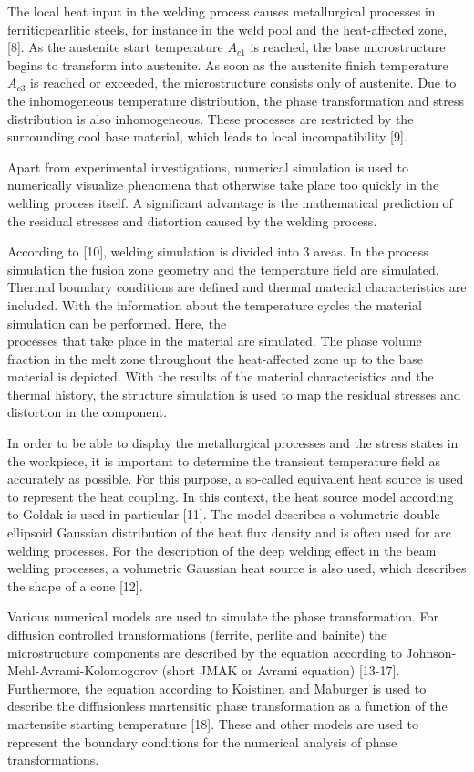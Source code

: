 \documentclass[10pt]{article}
\begin{document}
The local heat input in the welding process causes metallurgical processes in ferriticpearlitic steels, for instance in the weld pool and the heat-affected zone, [8]. As the austenite start temperature $A_{c 1}$ is reached, the base microstructure begins to transform into austenite. As soon as the austenite finish temperature $A_{c 3}$ is reached or exceeded, the microstructure consists only of austenite. Due to the inhomogeneous temperature distribution, the phase transformation and stress distribution is also inhomogeneous. These processes are restricted by the surrounding cool base material, which leads to local incompatibility [9].

Apart from experimental investigations, numerical simulation is used to numerically visualize phenomena that otherwise take place too quickly in the welding process itself. A significant advantage is the mathematical prediction of the residual stresses and distortion caused by the welding process.

According to [10], welding simulation is divided into 3 areas. In the process simulation the fusion zone geometry and the temperature field are simulated. Thermal boundary conditions are defined and thermal material characteristics are included. With the information about the temperature cycles the material simulation can be performed. Here, the\\
processes that take place in the material are simulated. The phase volume fraction in the melt zone throughout the heat-affected zone up to the base material is depicted. With the results of the material characteristics and the thermal history, the structure simulation is used to map the residual stresses and distortion in the component.

In order to be able to display the metallurgical processes and the stress states in the workpiece, it is important to determine the transient temperature field as accurately as possible. For this purpose, a so-called equivalent heat source is used to represent the heat coupling. In this context, the heat source model according to Goldak is used in particular [11]. The model describes a volumetric double ellipsoid Gaussian distribution of the heat flux density and is often used for arc welding processes. For the description of the deep welding effect in the beam welding processes, a volumetric Gaussian heat source is also used, which describes the shape of a cone [12].

Various numerical models are used to simulate the phase transformation. For diffusion controlled transformations (ferrite, perlite and bainite) the microstructure components are described by the equation according to Johnson-Mehl-Avrami-Kolomogorov (short JMAK or Avrami equation) [13-17]. Furthermore, the equation according to Koistinen and Maburger is used to describe the diffusionless martensitic phase transformation as a function of the martensite starting temperature [18]. These and other models are used to represent the boundary conditions for the numerical analysis of phase transformations.
\end{document}
